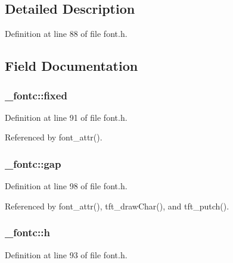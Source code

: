 \subsection{Detailed Description}


Definition at line 88 of file font.\-h.



\subsection{Field Documentation}
\hypertarget{struct__fontc_aec700f6ada95d1bced81fc2728633878}{
\subsubsection[{fixed}]{ \-\_\-fontc\-::fixed}}\label{struct__fontc_aec700f6ada95d1bced81fc2728633878}


Definition at line 91 of file font.\-h.



Referenced by font\-\_\-attr().

\hypertarget{struct__fontc_a38c23e7e200346fce3777d4efa30488f}{
\subsubsection[{gap}]{ \-\_\-fontc\-::gap}}\label{struct__fontc_a38c23e7e200346fce3777d4efa30488f}


Definition at line 98 of file font.\-h.



Referenced by font\-\_\-attr(), tft\-\_\-draw\-Char(), and tft\-\_\-putch().

\hypertarget{struct__fontc_a9feb8c838dfc1d4eebb15c8e53981944}{
\subsubsection[{h}]{ \-\_\-fontc\-::h}}\label{struct__fontc_a9feb8c838dfc1d4eebb15c8e53981944}


Definition at line 93 of file font.\-h.



